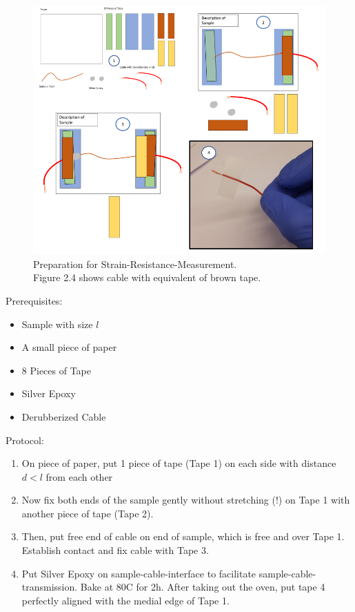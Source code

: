 \begin{figure}[H]
	\centering
	\includegraphics[width=\textwidth]{./pic/Meas_Prep_Together.PNG}
	\caption{Preparation for 
		Strain-Resistance-Measurement. \\
		Figure 2.4 shows cable with equivalent of brown tape.}
	\label{fig:MeasPrep}
\end{figure}


Prerequisites:

\begin{multicols}{2}
\begin{itemize}
    \item Sample with size $l$
    \item A small piece of paper
    \item 8 Pieces of Tape
    \item Silver Epoxy
    \item Derubberized Cable
\end{itemize}
\end{multicols}


Protocol:

\begin{enumerate}
	
    \item On piece of paper, put 1 piece of tape (Tape 1) on each side with distance $d < l$ from each other
    
    \item Now fix both ends of the sample gently without stretching (!) on Tape 1 with another piece of tape (Tape 2).
    
    \item Then, put free end of cable on end of sample, which is free and over Tape 1. Establish contact and fix cable with Tape 3.
    
    \item Put Silver Epoxy on sample-cable-interface to facilitate sample-cable-transmission. Bake at 80\textdegree C for 2h. After taking out the oven, put tape 4 perfectly aligned with the medial edge of Tape 1.
\end{enumerate}

